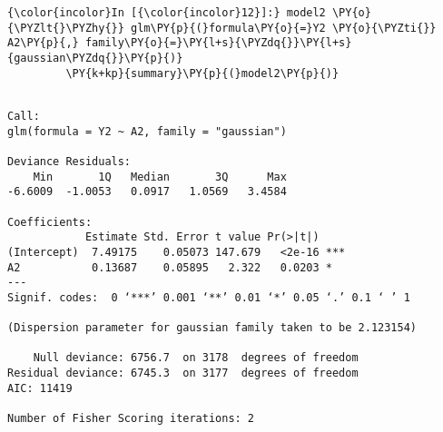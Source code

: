 
    
    \begin{Verbatim}[commandchars=\\\{\}]
{\color{incolor}In [{\color{incolor}12}]:} model2 \PY{o}{\PYZlt{}\PYZhy{}} glm\PY{p}{(}formula\PY{o}{=}Y2 \PY{o}{\PYZti{}} A2\PY{p}{,} family\PY{o}{=}\PY{l+s}{\PYZdq{}}\PY{l+s}{gaussian\PYZdq{}}\PY{p}{)}
         \PY{k+kp}{summary}\PY{p}{(}model2\PY{p}{)}
\end{Verbatim}


    
    \begin{verbatim}

Call:
glm(formula = Y2 ~ A2, family = "gaussian")

Deviance Residuals: 
    Min       1Q   Median       3Q      Max  
-6.6009  -1.0053   0.0917   1.0569   3.4584  

Coefficients:
            Estimate Std. Error t value Pr(>|t|)    
(Intercept)  7.49175    0.05073 147.679   <2e-16 ***
A2           0.13687    0.05895   2.322   0.0203 *  
---
Signif. codes:  0 ‘***’ 0.001 ‘**’ 0.01 ‘*’ 0.05 ‘.’ 0.1 ‘ ’ 1

(Dispersion parameter for gaussian family taken to be 2.123154)

    Null deviance: 6756.7  on 3178  degrees of freedom
Residual deviance: 6745.3  on 3177  degrees of freedom
AIC: 11419

Number of Fisher Scoring iterations: 2

    \end{verbatim}

   